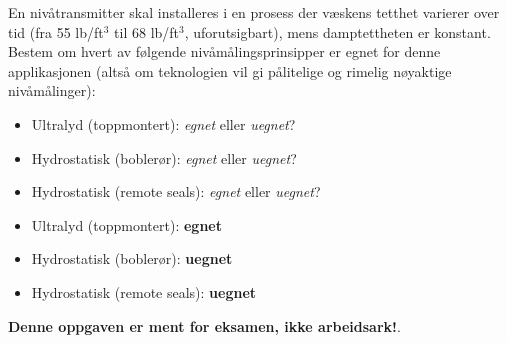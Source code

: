 

En nivåtransmitter skal installeres i en prosess der væskens tetthet varierer over tid (fra 55 lb/ft$^{3}$ til 68 lb/ft$^{3}$, uforutsigbart), mens damptettheten er konstant. Bestem om hvert av følgende nivåmålingsprinsipper er egnet for denne applikasjonen (altså om teknologien vil gi pålitelige og rimelig nøyaktige nivåmålinger):

\begin{itemize}
\item{} Ultralyd (toppmontert): {\it egnet} eller {\it uegnet}?
\vskip 10pt
\item{} Hydrostatisk (boblerør): {\it egnet} eller {\it uegnet}?
\vskip 10pt
\item{} Hydrostatisk (remote seals): {\it egnet} eller {\it uegnet}?
\end{itemize}







\begin{itemize}
\item{} Ultralyd (toppmontert): {\bf egnet}
\vskip 10pt
\item{} Hydrostatisk (boblerør): {\bf uegnet}
\vskip 10pt
\item{} Hydrostatisk (remote seals): {\bf uegnet}
\end{itemize}







{\bf Denne oppgaven er ment for eksamen, ikke arbeidsark!}.


